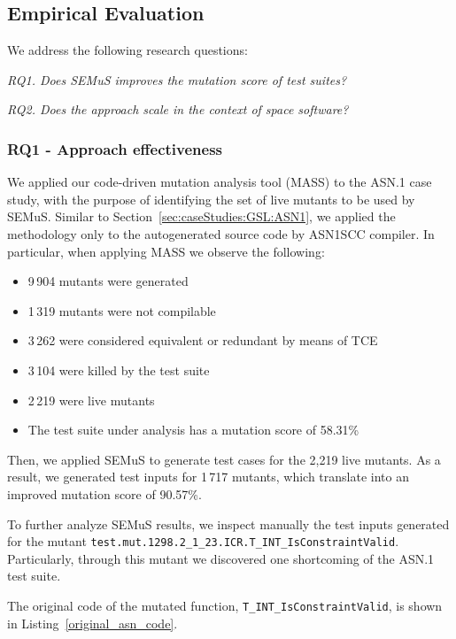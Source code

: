 
\subsection{Empirical Evaluation}

We address the following research questions:

\emph{RQ1. Does SEMuS improves the mutation score of test suites?}

\emph{RQ2. Does the approach scale in the context of space software?}

\subsubsection{RQ1 - Approach effectiveness}

We applied our code-driven mutation analysis tool (MASS) to the ASN.1 case study, with the purpose of identifying the set of live mutants to be used by SEMuS. Similar to Section~\ref{sec:caseStudies:GSL:ASN1}, we applied the methodology only to the autogenerated source code by ASN1SCC compiler. In particular, when applying MASS we observe the following:

\begin{itemize}
	\item 9\,904 mutants were generated
	\item 1\,319 mutants were not compilable
	\item 3\,262 were considered equivalent or redundant by means of TCE
	\item 3\,104 were killed by the test suite
	\item 2\,219 were live mutants
	\item The test suite under analysis has a mutation score of 58.31\%
\end{itemize}

Then, we applied SEMuS to generate test cases for the 2,219 live mutants. As a result, we generated test inputs for 1\,717 mutants, which translate into an improved mutation score of 90.57\%.

To further analyze SEMuS results, we inspect manually the test inputs generated for the mutant \texttt{test.mut.1298.2\_1\_23.ICR.T\_INT\_IsConstraintValid}. Particularly, through this mutant we discovered one shortcoming of the ASN.1 test suite.

The original code of the mutated function, \texttt{T\_INT\_IsConstraintValid}, is shown in Listing~\ref{original_asn_code}.

